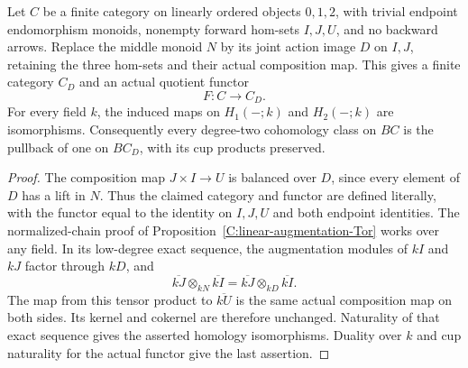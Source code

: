 \begin{lemma}
\label{C:linear-middle-profile-H2}
Let $C$ be a finite category on linearly ordered objects $0,1,2$,
with trivial endpoint endomorphism monoids, nonempty forward
hom-sets $I,J,U$, and no backward arrows.  Replace the middle
monoid $N$ by its joint action image $D$ on $I,J$, retaining
the three hom-sets and their actual composition map.  This gives
a finite category $C_D$ and an actual quotient functor
\[
 F:C\longrightarrow C_D.
\]
For every field $k$, the induced maps on $H_1(-;k)$ and
$H_2(-;k)$ are isomorphisms.  Consequently every degree-two
cohomology class on $BC$ is the pullback of one on $BC_D$,
with its cup products preserved.
\end{lemma}
\begin{proof}
The composition map $J\times I\to U$ is balanced over $D$,
since every element of $D$ has a lift in $N$.  Thus the claimed
category and functor are defined literally, with the functor
equal to the identity on $I,J,U$ and both endpoint identities.
The normalized-chain proof of
Proposition~\ref{C:linear-augmentation-Tor} works over any field.
In its low-degree exact sequence, the augmentation modules of
$kI$ and $kJ$ factor through $kD$, and
\[
 \overline{kJ}\otimes_{kN}\overline{kI}
 =\overline{kJ}\otimes_{kD}\overline{kI}.
\]
The map from this tensor product to $\overline{kU}$ is the same
actual composition map on both sides.  Its kernel and cokernel
are therefore unchanged.  Naturality of that exact sequence gives
the asserted homology isomorphisms.  Duality over $k$ and cup
naturality for the actual functor give the last assertion.
\end{proof}

